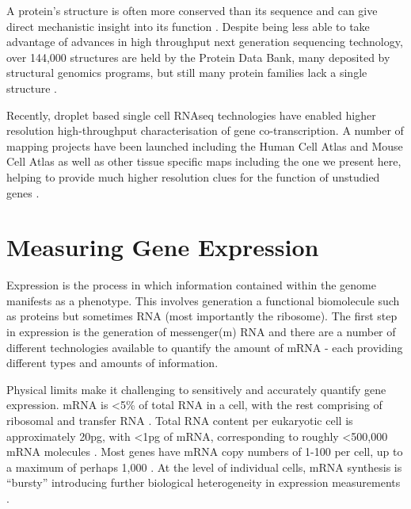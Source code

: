 A protein's structure is often more conserved than its sequence and can give direct mechanistic insight into its function \parencite{Illergard2009Structure, Sousounis2012Conservation}. Despite being less able to take advantage of advances in high throughput next generation sequencing technology, over 144,000 structures are held by the Protein Data Bank, many deposited by structural genomics programs, but still many protein families lack a single structure \parencite{wwPDBconsortium2019Protein, Grabowski2016Impact, Khafizov2014Trends}.

Recently, droplet based single cell RNAseq technologies have enabled higher resolution high-throughput characterisation of gene co-transcription. A number of mapping projects have been launched including the Human Cell Atlas and Mouse Cell Atlas as well as other tissue specific maps including the one we present here, helping to provide much higher resolution clues for the function of unstudied genes \parencite{Regev2017Human,Regev2018Human,Han2018Mapping,TheTabulaMurisConsortium2018Singlecell}.


\section{Measuring Gene Expression}

Expression is the process in which information contained within the genome manifests as a phenotype. This involves generation a functional biomolecule such as proteins but sometimes RNA (most importantly the ribosome). The first step in expression is the generation of messenger(m) RNA and there are a number of different technologies available to quantify the amount of mRNA - each providing different types and amounts of information.

Physical limits make it challenging to sensitively and accurately quantify gene expression. mRNA is <5\% of total RNA in a cell, with the rest comprising of ribosomal and transfer RNA \parencite{Warner1999economics}. Total RNA content per eukaryotic cell is approximately 20pg, with <1pg of mRNA, corresponding to roughly <500,000 mRNA molecules \parencite{Roozemond1976Ultramicrochemical, Uemura1980Agerelated, Tang2011Development}. Most genes have mRNA copy numbers of 1-100 per cell, up to a maximum of perhaps 1,000 \parencite{Marguerat2012Quantitative, Macaulay2014Single}. At the level of individual cells, mRNA synthesis is ``bursty'' introducing further biological heterogeneity in expression measurements \parencite{Raj2006Stochastic, Chubb2006Transcriptional}.

